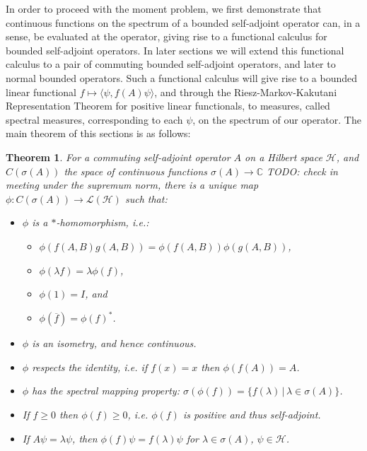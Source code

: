 \documentclass[12pt,oneside]{report}
\newtheorem{thm}{Theorem}[chapter]
\begin{document}
In order to proceed with the moment problem, we first demonstrate that continuous functions on the spectrum of a bounded self-adjoint operator can, in a sense, be evaluated at the operator, giving rise to a functional calculus for bounded self-adjoint operators. In later sections we will extend this functional calculus to a pair of commuting bounded self-adjoint operators, and later to normal bounded operators. Such a functional calculus will give rise to a bounded linear functional $f \mapsto \langle \psi, f(A) \psi \rangle$, and through the Riesz-Markov-Kakutani Representation Theorem for positive linear functionals, to measures, called spectral measures, corresponding to each $\psi$, on the spectrum of our operator. The main theorem of this sections is as follows:

\begin{thm}
    For a commuting self-adjoint operator $A$ on a Hilbert space $\mathscr{H}$, and $C(\sigma(A))$ the space of continuous functions $\sigma(A) \to \mathbb{C}$ TODO: check in meeting under the supremum norm, there is a unique map $\phi: C(\sigma(A)) \to \mathscr{L}(\mathscr{H})$ such that:
    \begin{itemize}
        \item $\phi$ is a $*$-homomorphism, i.e.:
        \begin{itemize}
            \item $\phi(f(A,B)g(A,B)) = \phi(f(A,B))\phi(g(A,B))$,
            \item $\phi(\lambda f) = \lambda \phi(f)$,
            \item $\phi(1) = I$, and
            \item $\phi(\overline{f}) = \phi(f)^{*}$.
        \end{itemize}
        \item $\phi$ is an isometry, and hence continuous.
        \item $\phi$ respects the identity, i.e. if $f(x) = x$ then $\phi(f(A)) = A$.
        \item $\phi$ has the spectral mapping property: $\sigma(\phi(f)) = \{ f(\lambda) \, | \, \lambda \in \sigma(A) \}$.
        \item If $f \geq 0$ then $\phi(f) \geq 0$, i.e. $\phi(f)$ is positive and thus self-adjoint.
        \item If $A\psi = \lambda \psi$, then $\phi(f)\psi = f(\lambda)\psi$ for $\lambda \in \sigma(A)$, $\psi \in \mathscr{H}$.
    \end{itemize}
\end{thm}
\end{document}
